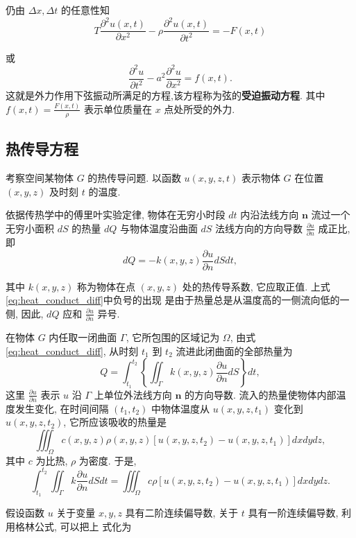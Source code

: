 仍由 $\Delta x, \Delta t$ 的任意性知
$$
T \frac{\partial^2 u(x, t)}{\partial x^2}-\rho \frac{\partial^2 u(x, t)}{\partial t^2}=-F(x, t)
$$

或
\begin{equation}
\frac{\partial^2 u}{\partial t^2}-a^2 \frac{\partial^2 u}{\partial x^2}=f(x, t) .
\label{eq:forced_vibration}
\end{equation}
这就是外力作用下弦振动所满足的方程,该方程称为弦的\textbf{受迫振动方程}.
其中 $f(x, t)=\frac{F(x, t)}{\rho}$ 表示单位质量在 $x$ 点处所受的外力.




\subsection{热传导方程}
考察空间某物体 $G$ 的热传导问题. 以函数 $u(x, y, z, t)$ 表示物体 $G$ 在位置 $(x, y, z)$ 
及时刻 $t$ 的温度.

依据传热学中的傅里叶实验定律, 物体在无穷小时段 $d t$ 内沿法线方向 $\boldsymbol{n}$ 流过一个无穷小面积 $d S$ 的热量 $d Q$ 
与物体温度沿曲面 $d S$ 法线方向的方向导数 $\frac{\partial u}{\partial n}$ 成正比, 即
\begin{equation}
d Q=-k(x, y, z) \frac{\partial u}{\partial n} d S d t,
\label{eq:heat_conduct_diff}
\end{equation}

其中 $k(x, y, z)$ 称为物体在点 $(x, y, z)$ 处的热传导系数, 它应取正值. 上式\ref{eq:heat_conduct_diff}中负号的出现
是由于热量总是从温度高的一侧流向低的一侧, 因此, $d Q$ 应和 $\frac{\partial u}{\partial n}$ 异号.

在物体 $G$ 内任取一闭曲面 $\Gamma$, 它所包围的区域记为 $\Omega$, 由式\ref{eq:heat_conduct_diff}, 
从时刻 $t_1$ 到 $t_2$ 流进此闭曲面的全部热量为
$$
Q=\int_{t_1}^{t_2}\left\{\iint_{\Gamma} k(x, y, z) \frac{\partial u}{\partial n} d S\right\} d t,
$$
这里 $\frac{\partial u}{\partial n}$ 表示 $u$ 沿 $\Gamma$ 上单位外法线方向 $\boldsymbol{n}$ 的方向导数.
流入的热量使物体内部温度发生变化, 在时间间隔 $\left(t_1, t_2\right)$ 中物体温度从 $u(x, y, z,  t_1 )$ 变化到 $u\left(x, y, z, t_2\right)$, 它所应该吸收的热量是
$$
\iiint_{\Omega} c(x, y, z) \rho(x, y, z)\left[u\left(x, y, z, t_2\right)-u\left(x, y, z, t_1\right)\right] d x d y d z,
$$
其中 $c$ 为比热, $\rho$ 为密度. 于是,
$$
    \int_{t_1}^{t_2} \iint_{\Gamma} k \frac{\partial u}{\partial n} d S d t=
    \iiint_{\Omega} c \rho\left[u\left(x, y, z, t_2\right)-u\left(x, y, z, t_1\right)\right] d x d y d z . 
$$

假设函数 $u$ 关于变量 $x, y, z$ 具有二阶连续偏导数, 关于 $t$ 具有一阶连续偏导数, 利用格林公式, 可以把上 式化为


